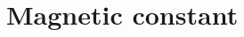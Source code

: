 \hypertarget{group___magnetic_constant}{}\section{Magnetic constant}
\label{group___magnetic_constant}
